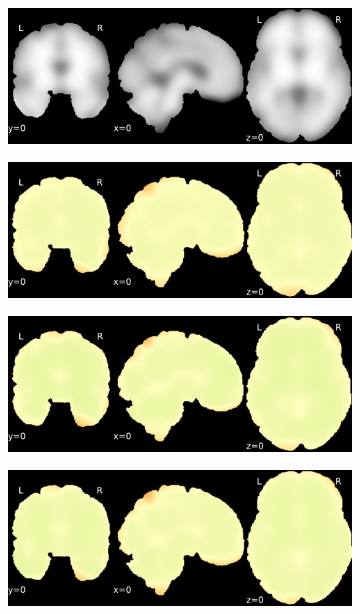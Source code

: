 \documentclass{article}
\begin{document}
\begin{appendices}
\begin{landscape}
\begin{figure}
            \begin{subfigure}[t]{0.2\paperheight}
                \centering
                \includegraphics[width=\textwidth]{figures/sig/20mm/ieee_ds002338_sub-xp207.pdf}
            \end{subfigure}
            \begin{subfigure}[t]{0.2\paperheight}
                \centering
                \includegraphics[width=\textwidth]{figures/sig/20mm/rr_ds002338_sub-xp207_sig.pdf}
            \end{subfigure}
            \begin{subfigure}[t]{0.2\paperheight}
                \centering
                \includegraphics[width=\textwidth]{figures/sig/20mm/rs_ds002338_sub-xp207_sig.pdf}
            \end{subfigure}
            \begin{subfigure}[t]{0.2\paperheight}
                \centering
                \includegraphics[width=\textwidth]{figures/sig/20mm/rr.rs_ds002338_sub-xp207_sig.pdf}

\end{subfigure}
\end{figure}
\end{landscape}
\end{appendices}
\end{document}
